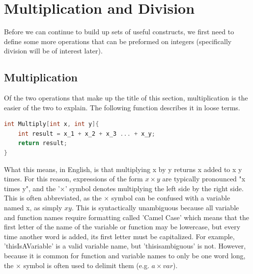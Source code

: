 \section{Multiplication and Division}
Before we can continue to build up sets of useful constructs, we first need to define some more operations that can be preformed on integers (specifically division will be of interest later). \\

\subsection{Multiplication}
Of the two operations that make up the title of this section, multiplication is the easier of the two to explain. The following function describes it in loose terms.
\begin{center}
\begin{lstlisting}[language=C,caption=Multiplication Function,label=lst:multFunc]
int Multiply[int x, int y]{
	int result = x_1 + x_2 + x_3 ... + x_y;
	return result;
}
\end{lstlisting}
\end{center}

What this means, in English, is that multiplying x by y returns x added to x y times. For this reason, expressions of the form $x\times y$ are typically pronounced "x times y", and the '$\times$' symbol denotes multiplying the left side by the right side. This is often abbreviated, as the $\times$ symbol can be confused with a variable named x, as simply $xy$. This is syntactically unambiguous because all variable and function names require formatting called 'Camel Case' which means that the first letter of the name of the variable or function may be lowercase, but every time another word is added, its first letter must be capitalized. For example, 'thisIsAVariable' is a valid variable name, but 'thisisambiguous' is not. However, because it is common for function and variable names to only be one word long, the $\times$ symbol is often used to delimit them (e.g. $a\times var$).


